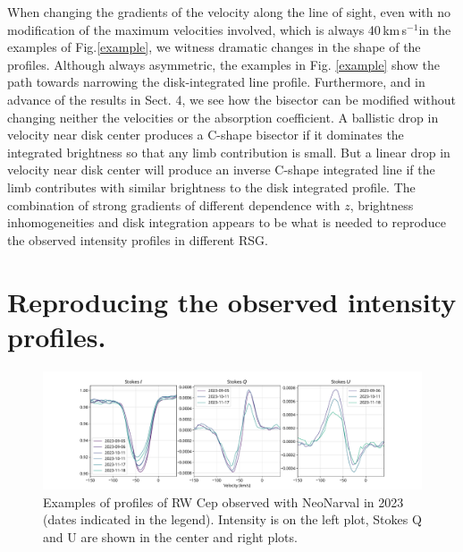 \documentclass{/Users/art2/TeX/aanda/aa}
\def\kms {km\,s$^{-1}$}
\begin{document}
When changing the gradients of the velocity along the line of sight, even with no modification of the maximum velocities involved, which is 
always 40\,\kms in the examples of Fig.\ref{example}, we witness dramatic changes in the shape of the profiles. Although always asymmetric, the 
examples 
in Fig. \ref{example} show the path towards narrowing the disk-integrated line profile. Furthermore, and in advance of the results in Sect. 4, we see how the bisector can be modified without 
changing neither the velocities or the absorption 
coefficient. A ballistic drop in velocity near disk center produces a C-shape bisector if it dominates the integrated brightness so that any limb 
contribution is 
small. But a linear drop in velocity near disk center will produce an inverse C-shape integrated line if the limb contributes with similar brightness 
to the 
disk integrated profile. The combination of strong gradients of different dependence with $z$, brightness inhomogeneities and disk integration 
appears to be what is needed to reproduce the observed intensity profiles in different RSG.

\section{Reproducing the observed intensity profiles.}

\begin{figure}
   \includegraphics[width=\textwidth]{RWCep-LSD.pdf}
   \caption{ Examples of profiles of RW Cep observed with NeoNarval in 2023 (dates indicated in the legend).  Intensity is on the left plot, Stokes Q and U are shown 
   in the center and right plots.}
   \label{observed}
   \end{figure}
\end{document}

